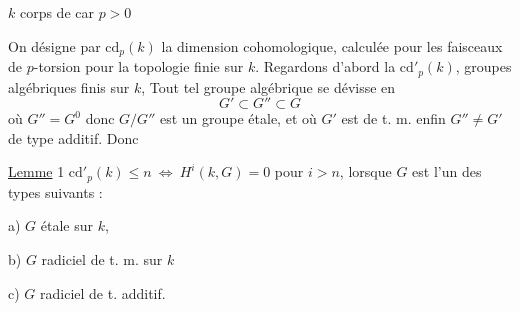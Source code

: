 $k$ corps de car $p>0$

On désigne par $\mathrm{cd}_{p}(k)$ la dimension cohomologique, calculée pour les faisceaux de $p$-torsion pour la topologie finie   sur $k$. Regardons d'abord la $\mathrm{cd}'_{p}(k)$,  groupes algébriques  finis sur $k$,  Tout tel groupe algébrique se dévisse en
\[
G'\subset G''\subset G
\]
où $G''=G^{0}$ donc $G/G''$ est un groupe étale, et où $G'$ est  de t. m. enfin $G''\neq G'$  de type additif. Donc

\uline{Lemme} 1 \quad $\mathrm{cd}'_{p}(k)\leq n\ \Longleftrightarrow\ H^{i}(k,G)=0$ pour $i>n$, lorsque $G$ est  l'un des types suivants :

a) $G$ étale sur $k$, 

b) $G$ radiciel de t. m. sur $k$

c) $G$  radiciel de t. additif.


